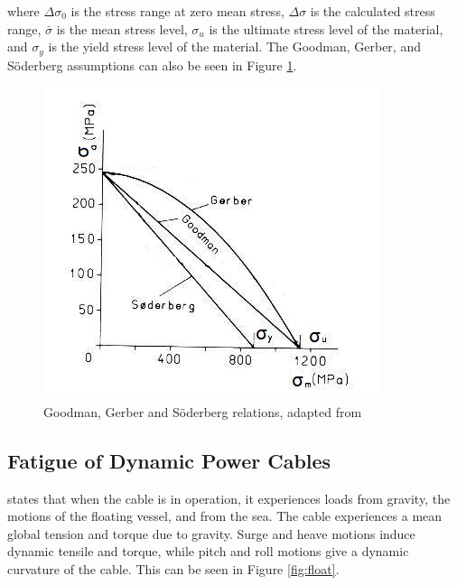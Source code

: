 \noindent where $\Delta \sigma_0$ is the stress range at zero mean stress, $\Delta \sigma$ is the calculated stress range, $\bar{\sigma}$ is the mean stress level, $\sigma_u$ is the ultimate stress level of the material, and $\sigma_y$ is the yield stress level of the material. The Goodman, Gerber, and Söderberg assumptions can also be seen in Figure \ref{fig:gerber}. 

\begin{figure}[H]
\centering
\includegraphics[scale=0.8]{figures/soder.PNG}
\caption[$\; \:$Goodman, Gerber and Söderberg relations]{Goodman, Gerber and Söderberg relations, adapted from \cite{fatiguehand} }
 \label{fig:gerber}
\end{figure}

\subsection{Fatigue of Dynamic Power Cables}
\noindent \cite{Nasution2013} states that when the cable is in operation, it experiences loads from gravity, the motions of the floating vessel, and from the sea. The cable experiences a mean global tension and torque due to gravity. Surge and heave motions induce dynamic tensile and torque, while pitch and roll motions give a dynamic curvature of the cable. This can be seen in Figure \ref{fig:float}. 


